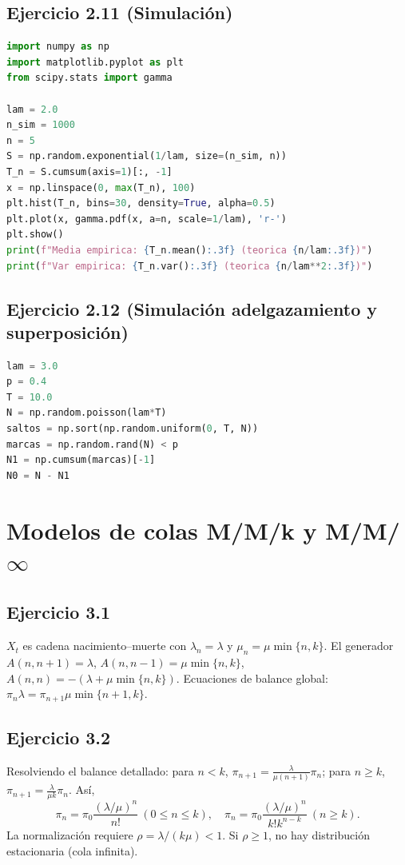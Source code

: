 \documentclass[12pt]{article}
\newcommand{\1}{\mathbf{1}}
\begin{document}
\subsection{Ejercicio 2.11 (Simulaci\'on)}
\begin{lstlisting}[language=Python]
import numpy as np
import matplotlib.pyplot as plt
from scipy.stats import gamma

lam = 2.0
n_sim = 1000
n = 5
S = np.random.exponential(1/lam, size=(n_sim, n))
T_n = S.cumsum(axis=1)[:, -1]
x = np.linspace(0, max(T_n), 100)
plt.hist(T_n, bins=30, density=True, alpha=0.5)
plt.plot(x, gamma.pdf(x, a=n, scale=1/lam), 'r-')
plt.show()
print(f"Media empirica: {T_n.mean():.3f} (teorica {n/lam:.3f})")
print(f"Var empirica: {T_n.var():.3f} (teorica {n/lam**2:.3f})")
\end{lstlisting}

\subsection{Ejercicio 2.12 (Simulaci\'on adelgazamiento y superposici\'on)}
\begin{lstlisting}[language=Python]
lam = 3.0
p = 0.4
T = 10.0
N = np.random.poisson(lam*T)
saltos = np.sort(np.random.uniform(0, T, N))
marcas = np.random.rand(N) < p
N1 = np.cumsum(marcas)[-1]
N0 = N - N1
\end{lstlisting}

\section{Modelos de colas M/M/k y M/M/$\infty$}

\subsection{Ejercicio 3.1}
$X_t$ es cadena nacimiento--muerte con $\lambda_n=\lambda$ y $\mu_n=\mu\min\{n,k\}$. El generador $A(n,n+1)=\lambda$, $A(n,n-1)=\mu\min\{n,k\}$, $A(n,n)=-(\lambda+\mu\min\{n,k\})$. Ecuaciones de balance global: $\pi_n\lambda=\pi_{n+1}\mu\min\{n+1,k\}$.

\subsection{Ejercicio 3.2}
Resolviendo el balance detallado: para $n<k$, $\pi_{n+1}=\frac{\lambda}{\mu(n+1)}\pi_n$; para $n\ge k$, $\pi_{n+1}=\frac{\lambda}{\mu k}\pi_n$. As\'i,
\[
\pi_n = \pi_0\frac{(\lambda/\mu)^n}{n!}\ (0\le n\le k),\quad \pi_n = \pi_0\frac{(\lambda/\mu)^n}{k!k^{n-k}}\ (n\ge k).
\]
La normalizaci\'on requiere $\rho=\lambda/(k\mu)<1$. Si $\rho\ge1$, no hay distribuci\'on estacionaria (cola infinita).
\end{document}

